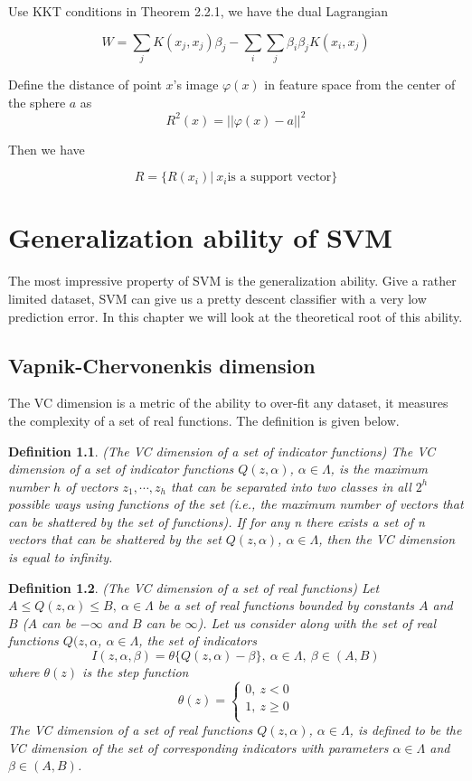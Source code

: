 \documentclass[a4paper]{report}
\newtheorem{definition}{Definition}[section]
\begin{document}
Use KKT conditions in Theorem 2.2.1, we have the dual Lagrangian

\[
    W=\sum_jK(x_j,x_j)\beta_j-\sum_i\sum_j\beta_i\beta_jK(x_i,x_j)
\]

Define the distance of point $x$'s image $\varphi(x)$ in feature space from the center of the sphere $a$ as
\[
    R^2(x)=||\varphi(x)-a||^2
\]

Then we have

\[
    R=\{R(x_i)|\ x_i \text{is a support vector} \}
\]

\chapter{Generalization ability of SVM}

The most impressive property of SVM is the generalization ability. Give a rather limited dataset, SVM can give us a pretty descent classifier with a very low prediction error. In this chapter we will look at the theoretical root of this ability.

\section{Vapnik-Chervonenkis dimension}

The VC dimension is a metric of the ability to over-fit any dataset, it measures the complexity of a set of real functions. The definition is given below.

\begin{definition}
    (The VC dimension of a set of indicator functions\cite{vapnik2013nature}) The VC dimension of a set of indicator functions $Q(z,\alpha)$, $\alpha\in\Lambda$, is the maximum number $h$ of vectors $z_1,\cdots,z_h$ that can be separated into two classes in all $2^h$ possible ways using functions of the set (i.e., the maximum number of vectors that can be shattered by the set of functions). If for any n there exists a set of n vectors that can be shattered by the set
    $Q(z,\alpha)$, $\alpha\in\Lambda$, then the VC dimension is equal to infinity.
\end{definition}

\begin{definition}
    (The VC dimension of a set of real functions\cite{vapnik2013nature}) Let $A\leq Q(z,\alpha)\leq B,\ \alpha\in \Lambda$ be a set of real functions bounded by constants $A$ and $B$ ($A$ can be $-\infty$ and $B$ can be $\infty$).
    Let us consider along with the set of real functions $Q(z,\alpha$, $\alpha\in \Lambda$, the set of indicators
    \[
        I(z,\alpha,\beta)=\theta\{Q(z,\alpha)-\beta\},\ \alpha\in\Lambda, \ \beta\in(A,B)
    \]
    where $\theta(z)$ is the step function
    \[
        \theta(z)=
        \begin{cases}
            0,\ z<0 \\
            1,\ z\geq 0\\
        \end{cases}
    \]
    The VC dimension of a set of real functions $Q(z,\alpha)$, $\alpha\in \Lambda$, is defined to be the VC dimension of the set of corresponding indicators with parameters $\alpha\in\Lambda$ and $\beta\in(A,B)$.
\end{definition}
\end{document}
